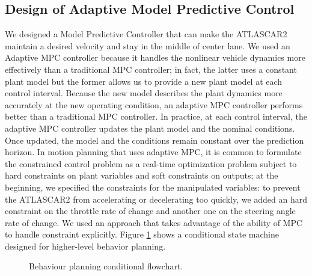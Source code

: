 \documentclass[conference,11pt]{IEEEtran}
\begin{document}
\subsection{Design of Adaptive Model Predictive Control}
We designed a Model Predictive Controller that can make the ATLASCAR2 maintain a desired velocity and stay in the middle of center lane. We used an Adaptive MPC controller because it handles the nonlinear vehicle dynamics more effectively than a traditional MPC controller; in fact, the latter uses a constant plant model but the former allows us to provide a new plant model at each control interval. Because the new model describes the plant dynamics more accurately at the new operating condition, an adaptive MPC controller performs better than a traditional MPC controller. In practice, at each control interval, the adaptive MPC controller updates the plant model and the nominal conditions. Once updated, the model and the conditions remain constant over the prediction horizon. In motion planning that uses adaptive MPC, it is common to formulate the constrained control problem as a real-time optimization problem subject to hard constraints on plant variables and soft constraints on outputs; at the beginning, we specified the constraints for the manipulated variables: to prevent the ATLASCAR2 from accelerating or decelerating too quickly, we added an hard constraint on the throttle rate of change and another one on the steering angle rate of change. We used an approach that takes advantage of the ability of MPC to handle constraint explicitly. Figure \ref{fig:flowchart} shows a conditional state machine designed for higher-level behavior planning.
\begin{figure}[H]
	\centering
	
	\caption{Behaviour planning conditional flowchart.}
	\label{fig:flowchart}
\end{figure}
\end{document}
